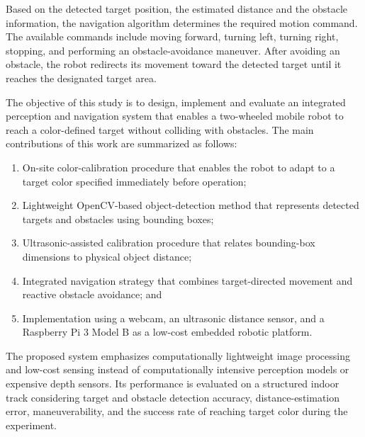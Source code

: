 Based on the detected target position, the estimated distance and the obstacle information, the navigation algorithm determines the required motion command. The available commands include moving forward, turning left, turning right, stopping, and performing an obstacle-avoidance maneuver. After avoiding an obstacle, the robot redirects its movement toward the detected target until it reaches the designated target area.

The objective of this study is to design, implement and evaluate an integrated perception and navigation system that enables a two-wheeled mobile robot to reach a color-defined target without colliding with obstacles. The main contributions of this work are summarized as follows:
\begin{enumerate}
    \item On-site color-calibration procedure that enables the robot to adapt to a target color specified immediately before operation;
    
    \item Lightweight OpenCV-based object-detection method that represents detected targets and obstacles using bounding boxes;
    
    \item Ultrasonic-assisted calibration procedure that relates bounding-box dimensions to physical object distance;
    
    \item Integrated navigation strategy that combines target-directed movement and reactive obstacle avoidance; and
    
    \item Implementation using a webcam, an ultrasonic distance sensor, and a Raspberry Pi 3 Model B as a low-cost embedded robotic platform.
\end{enumerate}

The proposed system emphasizes computationally lightweight image processing and low-cost sensing instead of computationally intensive perception models or expensive depth sensors. Its performance is evaluated on a structured indoor track considering target and obstacle detection accuracy, distance-estimation error, maneuverability, and the success rate of reaching target color during the experiment.
